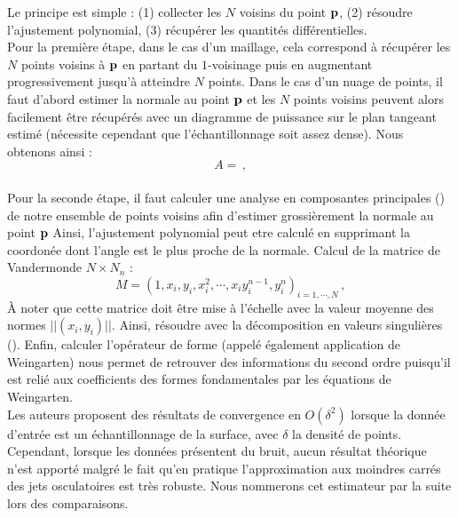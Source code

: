 Le principe est simple : (1) collecter les $N$ voisins du point $\mathbf{p}$, (2) résoudre l'ajustement polynomial, (3) récupérer les quantités différentielles.
%
\\
%
Pour la première étape, dans le cas d'un maillage, cela correspond à récupérer les $N$ points voisins à $\mathbf{p}$ en partant du $1$-voisinage puis en augmentant progressivement jusqu'à atteindre $N$ points. Dans le cas d'un nuage de points, il faut d'abord estimer la normale au point $\mathbf{p}$ et les $N$ points voisins peuvent alors facilement être récupérés avec un diagramme de puissance sur le plan tangeant estimé (nécessite cependant que l'échantillonnage soit assez dense). Nous obtenons ainsi :
\begin{equation}
  A =  \,,
\end{equation}
%
\\
%
Pour la seconde étape, il faut calculer une analyse en composantes principales (\ACP) de notre ensemble de points voisins afin d'estimer grossièrement la normale au point $\mathbf{p}$ Ainsi, l'ajustement polynomial peut etre calculé en supprimant la coordonée dont l'angle est le plus proche de la normale.
Calcul de la matrice de Vandermonde $N \times N_n$ :
%
\begin{equation}
  M =  (1,x_i, y_i, x^2_i, \cdots, x_iy_i^{n-1}, y_i^n)_{i=1,\cdots,N} \,,
\end{equation}
%
À noter que cette matrice doit être mise à l'échelle avec la valeur moyenne des
normes $||(x_i,y_i)||$. Ainsi, résoudre avec la décomposition en valeurs singulières
().
%
%
%
Enfin, calculer l'opérateur de forme (appelé également application de
Weingarten) nous permet de retrouver des informations du second ordre puisqu'il
est relié aux coefficients des formes fondamentales par les équations de
Weingarten.
%
\\
%
Les auteurs proposent des résultats de convergence en $O(\delta^2)$ lorsque la
donnée d'entrée est un échantillonnage de la surface, avec $\delta$ la densité
de points. Cependant, lorsque les données présentent du bruit, aucun résultat
théorique n'est apporté malgré le fait qu'en pratique l'approximation aux
moindres carrés des jets osculatoires est très robuste.
%
Nous nommerons cet estimateur par la suite \JetFitting lors des comparaisons.
%
